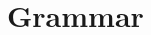 \documentclass{article}
\title{\Functive}
\author{Henry Blanchette}
\date{}
\renewcommand{\|}{ \ $|$ \ }
\begin{document}
\maketitle

\begin{spacing}{1.5}
\tableofcontents
\end{spacing}

\newpage

\section{Grammar}

\end{document}
